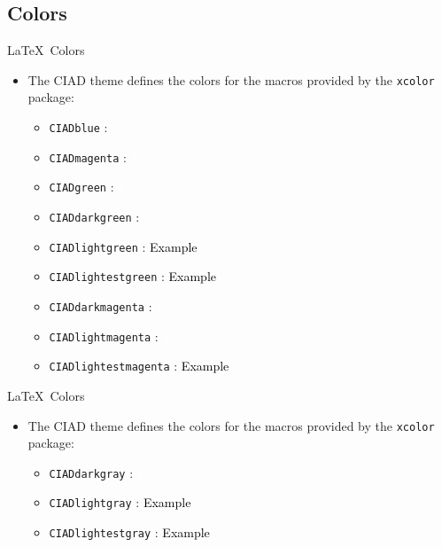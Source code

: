 \documentclass[english,sectioncirclenumberstyle]{ciadbeamer}
\begin{document}
\subsection{Colors}

\begin{frame}{{\LaTeX}\ Colors}
	\begin{itemize}
	\item The CIAD theme defines the colors for the macros provided by the \texttt{xcolor} package:
		\begin{itemize}
		\item \texttt{CIADblue} : \fbox{\textcolor{CIADblue}{Example}} \colorbox{CIADblue}{\textcolor{white}{Example}}
		\item \texttt{CIADmagenta} : \fbox{\textcolor{CIADmagenta}{Example}} \colorbox{CIADmagenta}{\textcolor{white}{Example}}
		\item \texttt{CIADgreen} : \fbox{\textcolor{CIADgreen}{Example}} \colorbox{CIADgreen}{\textcolor{white}{Example}}
		\item \texttt{CIADdarkgreen} : \fbox{\textcolor{CIADdarkgreen}{Example}} \colorbox{CIADdarkgreen}{\textcolor{white}{Example}}
		\item \texttt{CIADlightgreen} : \fbox{\textcolor{CIADlightgreen}{Example}} \colorbox{CIADlightgreen}{\textcolor{black}{Example}}
		\item \texttt{CIADlightestgreen} : \fbox{\textcolor{CIADlightestgreen}{Example}} \colorbox{CIADlightestgreen}{\textcolor{black}{Example}}
		\item \texttt{CIADdarkmagenta} : \fbox{\textcolor{CIADdarkmagenta}{Example}} \colorbox{CIADdarkmagenta}{\textcolor{white}{Example}}
		\item \texttt{CIADlightmagenta} : \fbox{\textcolor{CIADlightmagenta}{Example}} \colorbox{CIADlightmagenta}{\textcolor{white}{Example}}
		\item \texttt{CIADlightestmagenta} : \fbox{\textcolor{CIADlightestmagenta}{Example}} \colorbox{CIADlightestmagenta}{\textcolor{black}{Example}}
		\end{itemize}
	\end{itemize}
\end{frame}

\begin{frame}{{\LaTeX}\ Colors \insertcontinuationtext}
	\begin{itemize}
	\item The CIAD theme defines the colors for the macros provided by the \texttt{xcolor} package:
		\begin{itemize}
		\item \texttt{CIADdarkgray} : \fbox{\textcolor{CIADdarkgray}{Example}} \colorbox{CIADdarkgray}{\textcolor{white}{Example}}
		\item \texttt{CIADlightgray} : \fbox{\textcolor{CIADlightgray}{Example}} \colorbox{CIADlightgray}{\textcolor{black}{Example}}
		\item \texttt{CIADlightestgray} : \fbox{\textcolor{CIADlightestgray}{Example}} \colorbox{CIADlightestgray}{\textcolor{black}{Example}}
		\end{itemize}
	\end{itemize}
\end{frame}
\end{document}
